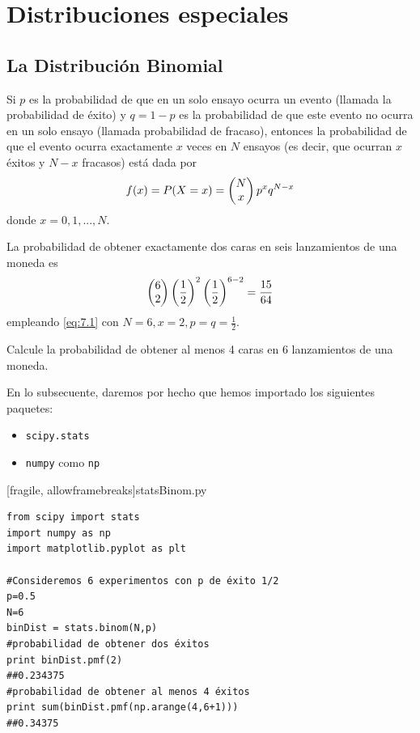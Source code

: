 \section{Distribuciones especiales}


\subsection{La Distribución Binomial}


 Si $p$ es la probabilidad de que en un solo ensayo ocurra un evento (llamada la probabilidad de éxito) y $q = 1 - p$ es la
probabilidad de que este evento no ocurra en un solo ensayo (llamada probabilidad de fracaso), entonces la probabilidad de que el evento ocurra exactamente $x$ veces en $N$ ensayos (es decir, que ocurran $x$ éxitos y $N - x$ fracasos) está
dada por
\begin{align}
 \label{eq:7.1}
 f(x)=P(X=x)=\begin{pmatrix} N \\ x\end{pmatrix}p^{x}q^{N-x}
\end{align}
donde $x=0,1,...,N.$


 \begin{ejemplo}
  \label{exmp:7.1}
  La probabilidad de obtener exactamente dos caras en seis lanzamientos de una moneda es
  \begin{align}
   \begin{pmatrix} 6 \\ 2\end{pmatrix}\left( \dfrac{1}{2} \right)^{2}\left( \dfrac{1}{2} \right)^{6-2}=\dfrac{15}{64}
  \end{align}
empleando \eqref{eq:7.1} con $N=6, x=2, p=q=\frac{1}{2}.$
 \end{ejemplo}



\begin{ejemplo}
 \label{exmp:7.2}
 Calcule la probabilidad de obtener al menos 4 caras en 6 lanzamientos de una moneda.
\end{ejemplo}



 En lo subsecuente, daremos por hecho que hemos importado los siguientes paquetes:
 \begin{itemize}
  \item \texttt{scipy.stats}
  \item \texttt{numpy} como \texttt{np}
 \end{itemize}


[fragile, allowframebreaks]{statsBinom.py}
\begin{verbatim}
from scipy import stats
import numpy as np
import matplotlib.pyplot as plt

#Consideremos 6 experimentos con p de éxito 1/2
p=0.5
N=6
binDist = stats.binom(N,p)
#probabilidad de obtener dos éxitos
print binDist.pmf(2)
##0.234375
#probabilidad de obtener al menos 4 éxitos
print sum(binDist.pmf(np.arange(4,6+1)))
##0.34375
 \end{verbatim}


